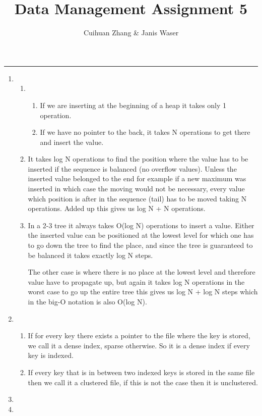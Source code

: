 \documentclass[12pt]{extarticle}
\title{Data Management Assignment 5}
\author{Cuihuan Zhang \& Janis Waser}
\begin{document}
\maketitle \vspace{-10mm}
\rule{\linewidth}{0.4pt}


\begin{flushleft}
\begin{enumerate}[label=\textbf{\Alph*.}]

\item 
\begin{enumerate}[label=\arabic*)]
\item \begin{enumerate}[label=(\alph*)]
\item If we are inserting at the beginning of a heap it takes only 1 operation. 
\item If we have no pointer to the back, it takes N operations to get there and insert the value.
\end{enumerate}
\item It takes log N operations to find the position where the value has to be inserted if the sequence is balanced (no overflow values). Unless the inserted value belonged to the end for example if a new maximum was inserted in which case the moving would not be necessary, every value which position is after in the sequence (tail) has to be moved taking N operations.  Added up this gives us log N + N operations. 
\item In a 2-3 tree it always takes O(log N) operations to insert a value. Either the inserted value can be positioned at the lowest level for which one has to go down the tree to find the place, and since the tree is guaranteed to be balanced it takes exactly log N steps.

The other case is where there is no place at the lowest level and therefore value have to propagate up, but again it takes log N operations in the worst case to go up the entire tree this gives us log N + log N steps which in the big-O notation is also O(log N).
\end{enumerate}
\item \begin{enumerate}[label=\arabic*)] 
\item If for every key there exists a pointer to the file where the key is stored, we call it a dense index, sparse otherwise. So it is a dense index if every key is indexed. 
\item If every key that is in between two indexed keys is stored in the same file then we call it a clustered file, if this is not the case then it is unclustered. 
\end{enumerate}
\item
\item
\end{enumerate}
\end{flushleft}
\end{document}
